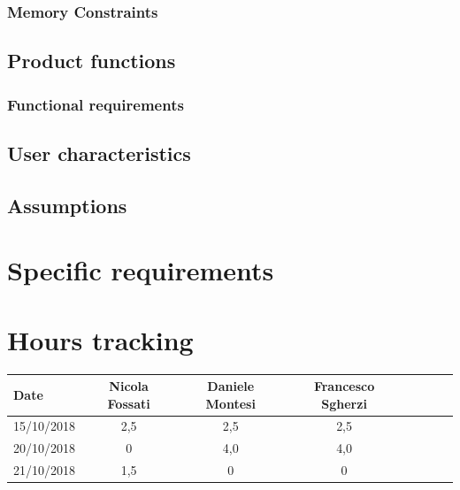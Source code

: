 \documentclass[a4paper,oneside,11pt]{article}
\begin{document}
            \subsubsection{Memory Constraints}
                
        
        
        
        \subsection{Product functions}
            
            \subsubsection{Functional requirements}
                
        \subsection{User characteristics}
        \subsection{Assumptions}
        
        
    \section{Specific requirements}
    
        \section{Hours tracking}
        \begin{tabular}{l*{6}{c}r}
            Date & Nicola Fossati & Daniele Montesi & Francesco Sgherzi \\
            \hline
            15/10/2018 & 2,5 & 2,5 & 2,5   \\
            \hline
            20/10/2018 & 0 & 4,0 & 4,0 \\
            \hline
            21/10/2018 & 1,5 & 0 & 0 \\
        \end{tabular}
\end{document}
